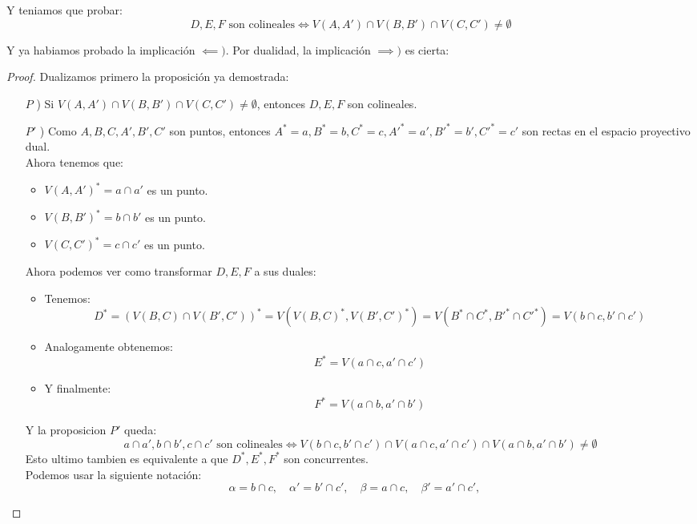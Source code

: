 Y teniamos que probar:
\[
    D, E, F \text{ son colineales} \iff
    V(A,A') \cap V(B,B') \cap V(C,C') \neq \emptyset
\]

Y ya habiamos probado la implicación $\impliedby )$. Por dualidad, la implicación $\implies )$ es cierta:

\begin{proof}
    Dualizamos primero la proposición ya demostrada:
    \begin{itemize}
        \item[$P$ )] Si $V(A,A') \cap V(B,B') \cap V(C,C') \neq \emptyset$, entonces $D, E, F$ son colineales.
        \item[$P'$ )] Como $A,B,C,A',B',C'$ son puntos, entonces $A^* = a, B^* = b, C^* = c, A'^* = a', B'^* = b', C'^* = c'$ son rectas en el espacio proyectivo dual.\\
        Ahora tenemos que:
        \begin{itemize}
            \item $V(A,A')^* = a \cap a'$ es un punto.
            \item $V(B,B')^* = b \cap b'$ es un punto.
            \item $V(C,C')^* = c \cap c'$ es un punto.
        \end{itemize}
        Ahora podemos ver como transformar $D, E, F$ a sus duales:
        \begin{itemize}
            \item Tenemos:
            \[
            D^* = 
            (V(B,C) \cap V(B',C'))^* =
            V(V(B,C)^*, V(B',C')^*) =
            V(B^* \cap C^*, B'^* \cap C'^*) =
            V(b \cap c, b' \cap c')
            \]
            \item Analogamente obtenemos:
            \[
            E^* = V(a \cap c, a' \cap c')
            \]
            \item Y finalmente:
            \[
            F^* = V(a \cap b, a' \cap b')
            \]
        \end{itemize}
        Y la proposicion $P'$ queda:
        \[
            a \cap a', b \cap b', c \cap c' \text{ son colineales} \iff
            V(b \cap c, b' \cap c') \cap V(a \cap c, a' \cap c') \cap V(a \cap b, a' \cap b') \neq \emptyset
        \]
        Esto ultimo tambien es equivalente a que $D^*, E^*, F^*$ son concurrentes.\\
        Podemos usar la siguiente notación:
        \[
            \alpha = b \cap c, \quad \alpha' = b' \cap c', \quad
            \beta = a \cap c, \quad \beta' = a' \cap c', \quad
\]
\end{itemize}
\end{proof}
